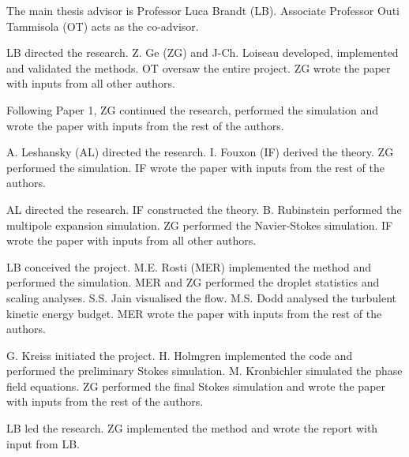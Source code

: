 %
\begin{divisionofwork}
	The main thesis advisor is Professor Luca Brandt (LB).
	Associate Professor Outi Tammisola (OT) acts as the co-advisor.

        \bigskip

	\paperitem
                LB directed the research.
                Z. Ge (ZG) and J-Ch. Loiseau developed, implemented and validated the methods.
                OT oversaw the entire project.
		ZG wrote the paper with inputs from all other authors.

	\paperitem
                Following Paper 1, ZG continued the research, performed the simulation
                and wrote the paper with inputs from the rest of the authors.

	\paperitem
                A. Leshansky (AL) directed the research.
                I. Fouxon (IF) derived the theory.
		ZG performed the simulation.
                IF wrote the paper with inputs from the rest of the authors.

	\paperitem
                AL directed the research.
                IF constructed the theory.
		B. Rubinstein performed the multipole expansion simulation.
                ZG performed the Navier-Stokes simulation.
                IF wrote the paper with inputs from all other authors.

	\paperitem
                LB conceived the project.
                M.E. Rosti (MER) implemented the method and performed the simulation.
		MER and ZG performed the droplet statistics and scaling analyses.
                S.S. Jain visualised the flow.
                M.S. Dodd analysed the turbulent kinetic energy budget.
                MER wrote the paper with inputs from the rest of the authors.

	\paperitem
                G. Kreiss initiated the project.
                H. Holmgren implemented the code and performed the preliminary Stokes simulation.
                M. Kronbichler simulated the phase field equations.
		ZG performed the final Stokes simulation and 
                wrote the paper with inputs from the rest of the authors.

	\paperitem
                LB led the research.
		ZG implemented the method and wrote the report with input from LB.
               

\end{divisionofwork}


